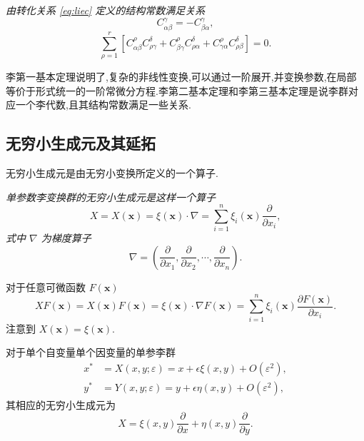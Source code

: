 \begin{theorem}[李第三基本定理]
\emph{由转化关系 \eqref{eq:liec} 定义的结构常数满足关系
\begin{equation*}
C_{\alpha\beta}^{\gamma}=-C_{\beta\alpha}^{\gamma},
\end{equation*}
\begin{equation*}
\sum_{\rho=1}^{r}[C_{\alpha\beta}^{\rho}C_{\rho\gamma}^{\delta}+C_{\beta\gamma}^{\rho}C_{\rho\alpha}^{\delta}+C_{\gamma\alpha}^{\rho}C_{\rho\beta}^{\delta}]=0.
\end{equation*}}
\end{theorem}

李第一基本定理说明了,复杂的非线性变换,可以通过一阶展开,并变换参数,在局部等价于形式统一的一阶常微分方程.李第二基本定理和李第三基本定理是说李群对应一个李代数,且其结构常数满足一些关系.

\subsection{无穷小生成元及其延拓}
无穷小生成元是由无穷小变换所定义的一个算子.
\begin{definition}[无穷小生成元]
\emph{	单参数李变换群的无穷小生成元是这样一个算子
	\begin{equation*}
		X=X(\mathbf{x})=\xi(\mathbf{x})\cdot \nabla = \sum_{i=1}^{n}\xi_i(\mathbf{x})\frac{\partial}{\partial x_i},
	\end{equation*}
	式中 $\nabla$ 为梯度算子
	\begin{equation*}
		\nabla=\left(\frac{\partial}{\partial x_1},\frac{\partial}{\partial x_2},\cdots,\frac{\partial}{\partial x_n}\right).
	\end{equation*}}
\end{definition}

对于任意可微函数 $F(\mathbf{x})$
\begin{equation*}
	XF(\mathbf{x})=X(\mathbf{x})F(\mathbf{x})=\xi(\mathbf{x})\cdot \nabla F(\mathbf{x}) = \sum_{i=1}^{n}\xi_i(\mathbf{x})\frac{\partial F(\mathbf{x})}{\partial x_i}.
\end{equation*}
注意到 $X(\mathbf{x})=\xi(\mathbf{x})$.

对于单个自变量单个因变量的单参李群
\begin{equation*}
\begin{aligned}
x^*&=X(x,y;\varepsilon)=x+\epsilon \xi(x,y)+O(\varepsilon^2),\\
y^*&=Y(x,y;\varepsilon)=y+\epsilon \eta(x,y)+O(\varepsilon^2),
\end{aligned}
\end{equation*}
其相应的无穷小生成元为
\begin{equation*}
X=\xi(x,y)\frac{\partial}{\partial x}+\eta(x,y)\frac{\partial}{\partial y}.
\end{equation*}

